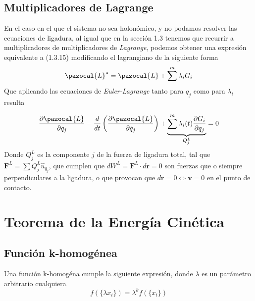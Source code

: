 \subsection{Multiplicadores de Lagrange}
En el caso en el que el sistema no sea holonómico, y no podamos resolver las ecuaciones de ligadura, al igual que en la sección 1.3 tenemos que recurrir a multiplicadores de multiplicadores de \textit{Lagrange}, podemos obtener una expresión equivalente a (1.3.15) modificando el lagrangiano de la siguiente forma
\begin{equation} \label{2.3.4}
    \pazocal{L}^* = \pazocal{L}+\sum^m{\lambda_i G_i}
\end{equation} 
Que aplicando las ecuaciones de \textit{Euler-Lagrange} tanto para $q_j$ como para $\lambda_i$ resulta

\vspace{-10pt}
\Large\begin{equation} \label{2.3.5}
    \frac{\partial \pazocal{L}}{\partial q_j} -\frac{d}{dt}\left(\frac{\partial \pazocal{L}}{\partial \dot{q}_j}\right) +\underbrace{\sum^m\lambda_i(t)\frac{\partial G_i}{\partial q_j}}_{Q^L_j}=0
\end{equation} \normalsize
Donde $Q^L_j$ es la componente $j$ de la fuerza de ligadura total, tal que $\mathbf{F}^L=\sum{Q^L_j \hat{u}_{q_j}}$, que cumplen que $dW^L = \mathbf{F}^L\cdot d\mathbf{r}=0$ son fuerzas que o siempre perpendiculares a la ligadura, o que provocan que $d\mathbf{r}=0 \iff \mathbf{v}=0$ en el punto de contacto.

\section{Teorema de la Energía Cinética}
\subsection{Función k-homogénea}
Una función k-homogéna cumple la siguiente expresión, donde $\lambda$ es un parámetro arbitrario cualquiera
\begin{equation} \label{2.4.1}
    f(\{\lambda x_i\})=\lambda^k f(\{x_i\})
\end{equation} 
\vspace{-35pt}
